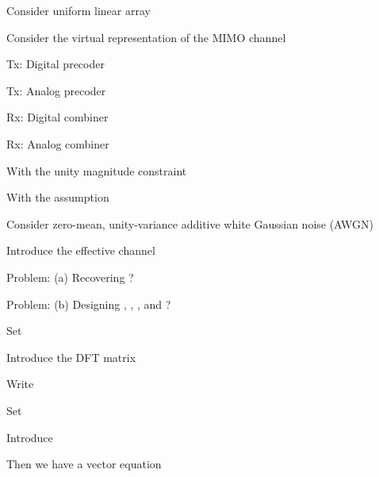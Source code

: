 {
\I Consider uniform linear array

\I Consider the virtual representation of the MIMO channel
}
{
\I Tx: Digital precoder 

\I Tx: Analog precoder 

\I Rx: Digital combiner 

\I Rx: Analog combiner 

\I With the unity magnitude constraint

\I With the assumption 
}
{
\I Consider zero-mean, unity-variance additive white Gaussian noise (AWGN) 

\I Introduce the effective channel

\I Problem: (a) Recovering ?

\I Problem: (b) Designing , , , and ?
}
{
\I Set 

\I Introduce the DFT matrix 

\I Write 
}
{
\I Set 

\I Introduce

\I Then we have a vector equation
}

